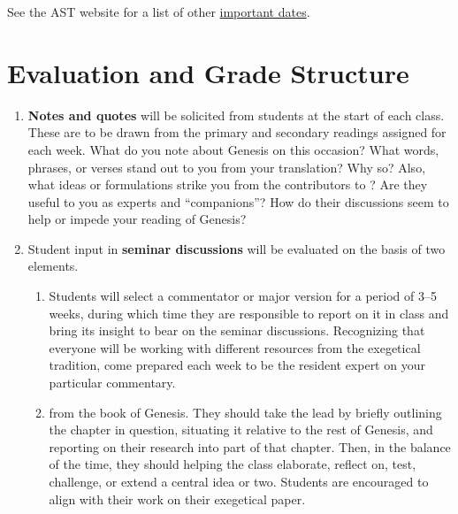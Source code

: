 \documentclass[titlepage]{article}
\begin{document}
See the AST website for a list of other \href{http://www.astheology.ns.ca/students/academic-dates.html}{important dates}.

\section{Evaluation and Grade Structure}
\label{evaluation}

\begin{enumerate}

	\item \textbf{Notes and quotes} will be solicited from students at the
	start of each class. These are to be drawn from the primary and
	secondary readings assigned for each week. What do you note about
	Genesis on this occasion? What words, phrases, or verses stand out to
	you from your translation? Why so? Also, what ideas or formulations
	strike you from the contributors to \cite{ccg}? Are they useful to you
	as experts and “companions”? How do their discussions seem to help or
	impede your reading of Genesis?

	\item Student input in \textbf{seminar discussions} will be evaluated on
	the basis of two elements.

	\begin{enumerate}

		\item Students will select a commentator or major version for a
		period of 3--5 weeks, during which time they are responsible to
		report on it in class and bring its insight to bear on the seminar
		discussions. Recognizing that everyone will be working with
		different resources from the exegetical tradition, come prepared
		each week to be the resident expert on your particular commentary.

		\item {} from
		the book of Genesis. They should take the lead by briefly
		outlining the chapter in question, situating it relative to the
		rest of Genesis, and reporting on their research into part of
		that chapter. Then, in the balance of the time, they should
		helping the class elaborate, reflect on, test, challenge, or
		extend a central idea or two. Students are encouraged to align
		with their work on their exegetical paper.


\end{enumerate}
\end{enumerate}
\end{document}
